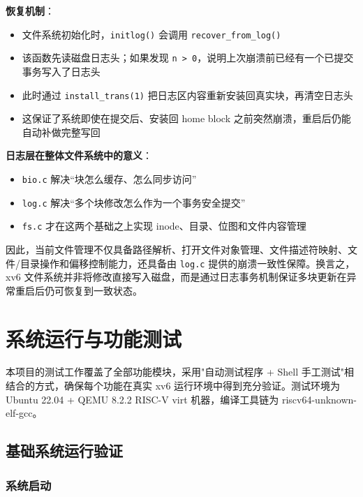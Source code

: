 \documentclass[12pt,a4paper]{ctexart}
\begin{document}
\textbf{恢复机制}：
\begin{itemize}
  \item 文件系统初始化时，\texttt{initlog()} 会调用 \texttt{recover\_from\_log()}
  \item 该函数先读磁盘日志头；如果发现 \texttt{n > 0}，说明上次崩溃前已经有一个已提交事务写入了日志头
  \item 此时通过 \texttt{install\_trans(1)} 把日志区内容重新安装回真实块，再清空日志头
  \item 这保证了系统即使在提交后、安装回 home block 之前突然崩溃，重启后仍能自动补做完整写回
\end{itemize}

\textbf{日志层在整体文件系统中的意义}：
\begin{itemize}
  \item \texttt{bio.c} 解决“块怎么缓存、怎么同步访问”
  \item \texttt{log.c} 解决“多个块修改怎么作为一个事务安全提交”
  \item \texttt{fs.c} 才在这两个基础之上实现 inode、目录、位图和文件内容管理
\end{itemize}

因此，当前文件管理不仅具备路径解析、打开文件对象管理、文件描述符映射、文件/目录操作和偏移控制能力，还具备由 \texttt{log.c} 提供的崩溃一致性保障。换言之，xv6 文件系统并非将修改直接写入磁盘，而是通过日志事务机制保证多块更新在异常重启后仍可恢复到一致状态。

\newpage

\section{系统运行与功能测试}

本项目的测试工作覆盖了全部功能模块，采用"自动测试程序 + Shell 手工测试"相结合的方式，确保每个功能在真实 xv6 运行环境中得到充分验证。测试环境为 Ubuntu 22.04 + QEMU 8.2.2 RISC-V virt 机器，编译工具链为 riscv64-unknown-elf-gcc。

\subsection{基础系统运行验证}

\subsubsection{系统启动}
\end{document}
